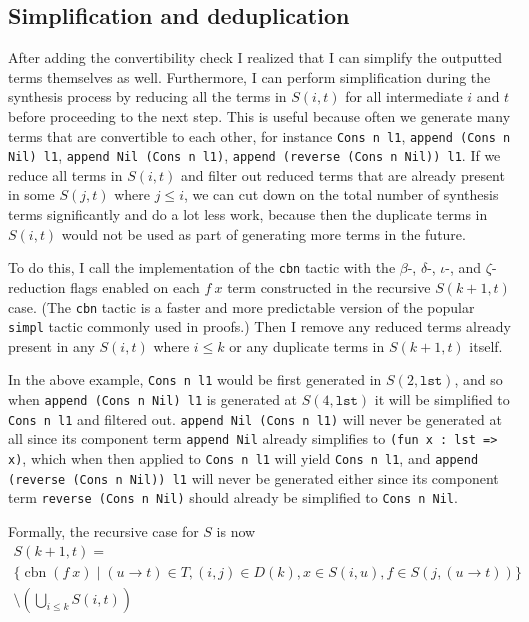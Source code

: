 \documentclass[11pt]{article}
\newcommand{\coq}[1]{\texttt{#1}}
\DeclareMathOperator{\cbn}{cbn}
\begin{document}
\subsection{Simplification and deduplication}

After adding the convertibility check I realized that I can simplify the outputted terms themselves as well. Furthermore, I can perform simplification during the synthesis process by reducing all the terms in $S(i, t)$ for all intermediate $i$ and $t$ before proceeding to the next step. This is useful because often we generate many terms that are convertible to each other, for instance \coq{Cons n l1}, \coq{append (Cons n Nil) l1}, \coq{append Nil (Cons n l1)}, \coq{append (reverse (Cons n Nil)) l1}. If we reduce all terms in $S(i, t)$ and filter out reduced terms that are already present in some $S(j, t)$ where $j \leq i$, we can cut down on the total number of synthesis terms significantly and do a lot less work, because then the duplicate terms in $S(i, t)$ would not be used as part of generating more terms in the future.

To do this, I call the implementation of the \coq{cbn} tactic with the $\beta$-, \mbox{$\delta$-,} $\iota$-, and $\zeta$-reduction flags enabled on each $f\ x$ term constructed in the recursive $S(k+1, t)$ case. (The \coq{cbn} tactic is a faster and more predictable version of the popular \coq{simpl} tactic commonly used in proofs.) Then I remove any reduced terms already present in any $S(i, t)$ where $i \leq k$ or any duplicate terms in $S(k+1, t)$ itself.

In the above example, \coq{Cons n l1} would be first generated in $S(2, \coq{lst})$, and so when \coq{append (Cons n Nil) l1} is generated at $S(4, \coq{lst})$ it will be simplified to \coq{Cons n l1} and filtered out. \coq{append Nil (Cons n l1)} will never be generated at all since its component term \coq{append Nil} already simplifies to \coq{(fun x : lst => x)}, which when then applied to \coq{Cons n l1} will yield \coq{Cons n l1}, and \coq{append (reverse (Cons n Nil)) l1} will never be generated either since its component term \coq{reverse (Cons n Nil)} should already be simplified to \coq{Cons n Nil}.

Formally, the recursive case for $S$ is now
\begin{multline*}
    S(k+1, t) = \\
    \{\cbn(f\ x) \mid (u \to t) \in T, (i, j) \in D(k), x \in S(i, u), f \in S(j, (u \to t))\} \\
    \setminus \left(\bigcup_{i \leq k} S(i, t)\right)
\end{multline*}
\end{document}
